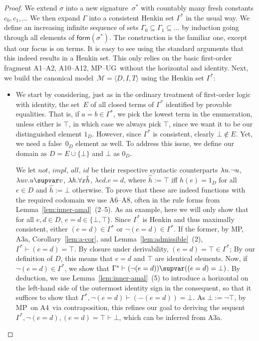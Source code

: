 \documentclass{preprint}
\newcommand{\form}{\mathsf{form}}
\newcommand{\ia}{A1}%
\newcommand{\iia}{A2}%
\newcommand{\iiia}{A3a}%
\newcommand{\iv}{A4}%
\newcommand{\aneg}{A6}%
\newcommand{\aquant}{A8}%
\newcommand{\hypsyll}{A10}%
\newcommand{\fug}{A12}%
\renewcommand{\mp}{MP}%
\newcommand{\ug}{UG}%
\renewcommand{\to}{\supvar}
\begin{document}
\begin{proof}
We extend $\sigma$ into a new signature~$\sigma^*$ with countably many fresh constants $c_0, c_1, ...$ 
We then expand $\Gamma$ into a consistent Henkin set $\Gamma^*$ in the usual way. We define an increasing infinite sequence of sets $\Gamma_0 \subseteq \Gamma_1 \subseteq ...$ by induction going through all elements of $\form(\sigma^*)$. 
The construction is the familiar one, except that our focus is on terms. It is easy to see using the standard arguments that this indeed results in a Henkin set. This only relies on the basic first-order fragment \ia--\iia, \hypsyll--\fug, \mp--\ug~without the horizontal and identity. 
Next, we build the canonical model~$\mathcal{M} = \langle D, I, T\rangle$ using the Henkin set $\Gamma^*$:

\begin{itemize}
	\item 
	We start by considering, just as in the ordinary treatment of first-order logic with identity, the set~$E$ of all closed terms of $\Gamma^*$ identified by provable equalities. That is, if $a = b \in \Gamma^*$, we pick the lowest term in the enumeration, unless either is $\top$, in which case we always pick $\top$, since we want it to be our distinguished element $1_D$. 
	However, since $\Gamma^*$ is consistent, clearly $\bot \notin E$. Yet, we need a false~$0_D$ element as well. To address this issue, we define our domain as $D = E \cup \{ \bot\}$ and $\bot$ as $0_D$. 
	

	We let $not$, $impl$, $all$, $id$ be their respective syntactic counterparts $\lambda u. \neg u$, $\lambda u v. u \to v$, $\lambda h. \forall x \hat{h}$, $\lambda e d. e = d$, where $\hat{h} := \top$ iff $h(e) = 1_D$ for all $e \in D$ and $\hat{h} := \bot$ otherwise. To prove that these are indeed functions with the required codomain we use \aneg--\aquant, often in the rule forms from Lemma~\ref{lem:inner-amal}~(2--5). 
	As an example, here we will only show that for all $e, d \in D$, $e = d \in \{\bot, \top\}$. 
	Since $\Gamma^*$ is Henkin and thus maximally consistent, either $(e = d) \in \Gamma^*$ or $\neg (e = d) \in \Gamma^*$. 
	If the former, by {\mp}, \iiia, Corollary~\ref{lem:a-cor}, and Lemma~\ref{lem:admissible}~(2), $\Gamma^* \vdash (e = d) = \top$. By closure under derivability, $(e = d) = \top \in \Gamma^*$; By our definition of $D$, this means that $e = d$ and $\top$ are identical elements. 
	Now, if $\neg (e = d) \in \Gamma^*$, we show that $\Gamma^* \vdash (\neg (e = d)) \to ((e = d) = \bot)$. By deduction, we use Lemma~\ref{lem:inner-amal}~(5) to introduce a horizontal on the left-hand side of the outermost identity sign in the consequent, so that it suffices to show that $\Gamma^*, \neg (e = d) \vdash (- (e = d)) = \bot$. 
	As $\bot := \neg \top$, by \mp~on \iv~via contraposition, this refines our goal to deriving the sequent $\Gamma^*, \neg (e = d), (e = d) = \top \vdash \bot$, which can be inferred from \iiia. 
		

\end{itemize}
\end{proof}
\end{document}
